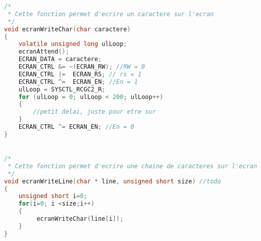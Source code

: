 \begin{lstlisting}[language=C]
/*
 * Cette fonction permet d'ecrire un caractere sur l'ecran
 */
void ecranWriteChar(char caractere)
{
    volatile unsigned long ulLoop;
    ecranAttend();
    ECRAN_DATA = caractere;
    ECRAN_CTRL &= ~(ECRAN_RW); //RW = 0
    ECRAN_CTRL |=  ECRAN_RS; // rs = 1
    ECRAN_CTRL ^=  ECRAN_EN; //En = 1
    ulLoop = SYSCTL_RCGC2_R;
    for (ulLoop = 0; ulLoop < 200; ulLoop++) 
    {
        //petit delai, juste pour etre sur
    }
    ECRAN_CTRL ^= ECRAN_EN; //En = 0
}


/*
 * Cette fonction permet d'ecrire une chaine de caracteres sur l'ecran
 */
void ecranWriteLine(char * line, unsigned short size) //todo
{
    unsigned short i=0;
    for(i=0; i <size;i++)
    {
         ecranWriteChar(line[i]);
    }
}

\end{lstlisting}

